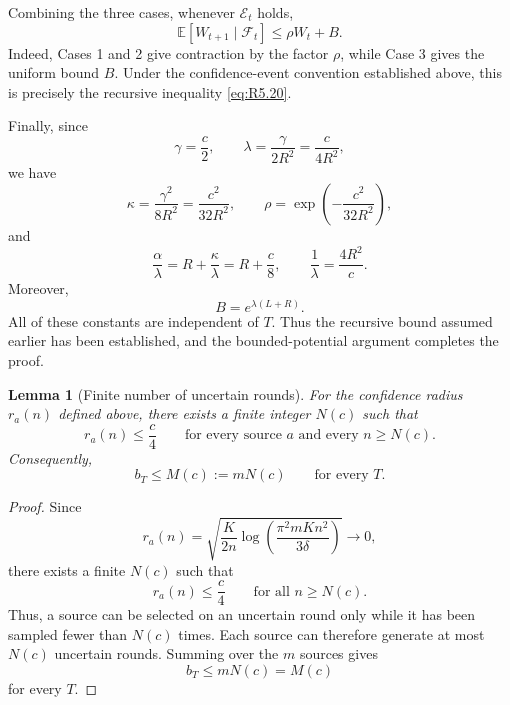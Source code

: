 \documentclass[twoside]{article}
\newtheorem{lemma}{Lemma}
\begin{document}
Combining the three cases, whenever \(\mathcal E_t\) holds,
\begin{equation}
    \mathbb E[
        W_{t+1}\mid\mathcal F_t
    ]
    \le
    \rho W_t+B.
    \tag{R5.36}
    \label{eq:R5.36}
\end{equation}
Indeed, Cases 1 and 2 give contraction by the factor \(\rho\), while
Case 3 gives the uniform bound \(B\). Under the confidence-event convention
established above, this is precisely the recursive inequality
\eqref{eq:R5.20}.

Finally, since
\[
    \gamma=\frac c2,
    \qquad
    \lambda
    =
    \frac{\gamma}{2R^2}
    =
    \frac{c}{4R^2},
\]
we have
\[
    \kappa
    =
    \frac{\gamma^2}{8R^2}
    =
    \frac{c^2}{32R^2},
    \qquad
    \rho
    =
    \exp\left(
        -\frac{c^2}{32R^2}
    \right),
\]
and
\[
    \frac{\alpha}{\lambda}
    =
    R+\frac{\kappa}{\lambda}
    =
    R+\frac c8,
    \qquad
    \frac1\lambda
    =
    \frac{4R^2}{c}.
\]
Moreover,
\[
    B
    =
    e^{\lambda(L+R)}.
\]
All of these constants are independent of \(T\). Thus the recursive bound
assumed earlier has been established, and the bounded-potential argument
completes the proof.

\begin{lemma}[Finite number of uncertain rounds]
\label{lem:finite-uncertain-rounds}
For the confidence radius \(r_a(n)\) defined above, there exists a finite
integer \(N(c)\) such that
\[
    r_a(n)\le \frac{c}{4}
    \qquad\text{for every source }a
    \text{ and every }n\ge N(c).
\]
Consequently,
\[
    b_T\le M(c):=mN(c)
    \qquad\text{for every }T.
\]
\end{lemma}

\begin{proof}
Since
\[
    r_a(n)
    =
    \sqrt{
        \frac{K}{2n}
        \log\left(
            \frac{\pi^2mKn^2}{3\delta}
        \right)
    }
    \longrightarrow 0,
\]
there exists a finite \(N(c)\) such that
\[
    r_a(n)\le\frac{c}{4}
    \qquad
    \text{for all }n\ge N(c).
\]
Thus, a source can be selected on an uncertain round only while it has been
sampled fewer than \(N(c)\) times. Each source can therefore generate at most
\(N(c)\) uncertain rounds. Summing over the \(m\) sources gives
\[
    b_T\le mN(c)=M(c)
\]
for every \(T\).
\end{proof}
\end{document}
